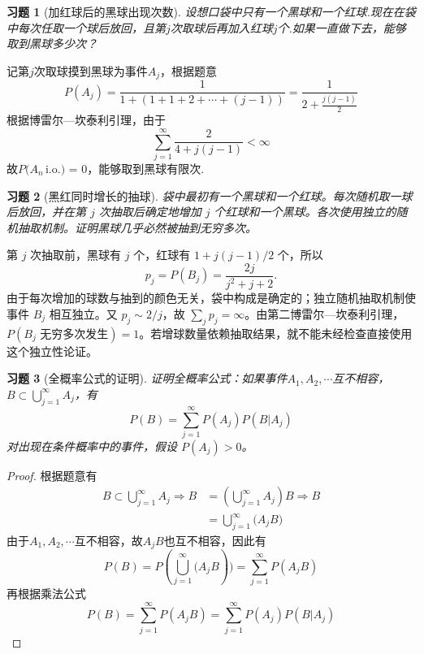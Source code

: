 \documentclass[12pt,fontset=fandol]{ctexart}
\newtheorem{exercise}{习题}[section]
\begin{document}
\begin{exercise}[加红球后的黑球出现次数]\label{q:Y2.28}
设想口袋中只有一个黑球和一个红球.现在在袋中每次任取一个球后放回，且第$j$次取球后再加入红球$j$个.如果一直做下去，能够取到黑球多少次？\par{}
\end{exercise}

\begin{solve}\label{a:Y2.28}
记第$j$次取球摸到黑球为事件$A_j$，根据题意
\[P({A_j}) = \frac{1}{{1 + (1 + 1 + 2 +  \cdots  + (j - 1))}} = \frac{1}{{2 + \frac{{j(j - 1)}}{2}}}\]
根据博雷尔—坎泰利引理，由于
\[\sum\limits_{j = 1}^\infty  {\frac{2}{{4 + j(j - 1)}}}  < \infty \]
故$P({A_n}\,{\text{i}}.{\text{o}}{\text{.) = 0}}$，能够取到黑球有限次.
\end{solve}

\begin{exercise}[黑红同时增长的抽球]\label{q:Y2.29}
袋中最初有一个黑球和一个红球。每次随机取一球后放回，并在第 $j$ 次抽取后确定地增加 $j$ 个红球和一个黑球。各次使用独立的随机抽取机制。证明黑球几乎必然被抽到无穷多次。\par{}
\end{exercise}

\begin{solve}\label{a:Y2.29}第 $j$ 次抽取前，黑球有 $j$ 个，红球有 $1+j(j-1)/2$ 个，所以\[p_j=P(B_j)=\frac{2j}{j^2+j+2}.\]由于每次增加的球数与抽到的颜色无关，袋中构成是确定的；独立随机抽取机制使事件 $B_j$ 相互独立。又 $p_j\sim2/j$，故 $\sum_jp_j=\infty$。由第二博雷尔—坎泰利引理，$P(B_j\text{ 无穷多次发生})=1$。若增球数量依赖抽取结果，就不能未经检查直接使用这个独立性论证。\end{solve}

\begin{exercise}[全概率公式的证明]\label{q:Y2.30}
证明全概率公式：如果事件$A_1,A_2,\cdots$互不相容，$B\subset \bigcup\limits_{j = 1}^\infty  {{A_j}} $，有
\[P(B) = \sum\limits_{j = 1}^\infty  {P({A_j})P(B|{A_j})} \] 对出现在条件概率中的事件，假设 $P(A_j)>0$。\par{}
\end{exercise}

\begin{proof}\label{a:Y2.30}
根据题意有
\[\begin{aligned}B \subset \bigcup\limits_{j = 1}^\infty  {{A_j}}  \Rightarrow B &= (\bigcup\limits_{j = 1}^\infty  {{A_j}} )B \Rightarrow B \\&= \bigcup\limits_{j = 1}^\infty  {({A_j}} B)\end{aligned}\]
由于$A_1,A_2,\cdots$互不相容，故$A_jB$也互不相容，因此有
\[P(B) = P(\bigcup\limits_{j = 1}^\infty  {({A_j}} B)) = \sum\limits_{j = 1}^\infty  {P({A_j}B)} \]
再根据乘法公式
\[P(B) = \sum\limits_{j = 1}^\infty  {P({A_j}B)}  = \sum\limits_{j = 1}^\infty  {P({A_j})P(B|{A_j})} \]
\end{proof}
\end{document}
